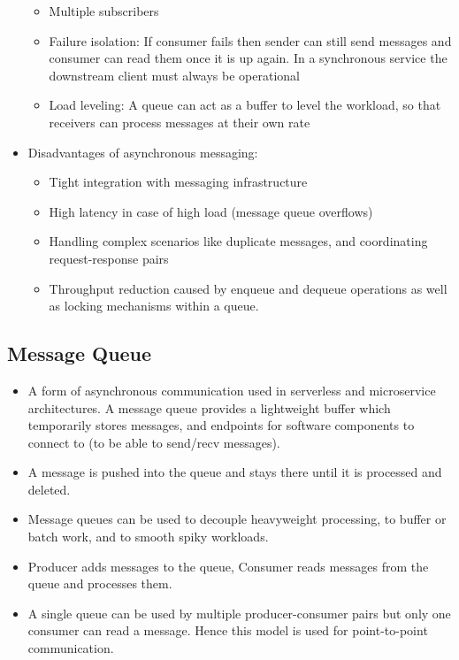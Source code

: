 \documentclass{article}
\begin{document}
\begin{itemize}
\begin{itemize}
        \item Multiple subscribers
        
        \item Failure isolation: If consumer fails then sender can still send messages and consumer can read them once it is up again. In a synchronous service the downstream client must always be operational 
        
        \item Load leveling: A queue can act as a buffer to level the workload, so that receivers can process messages at their own rate
    \end{itemize}
    
    \item Disadvantages of asynchronous messaging:
    \begin{itemize}
        \item Tight integration with messaging infrastructure
        
        \item High latency in case of high load (message queue overflows)
        
        \item Handling complex scenarios like duplicate messages, and coordinating request-response pairs
        
        \item Throughput reduction caused by enqueue and dequeue operations as well as locking mechanisms within a queue. 
    \end{itemize}
\end{itemize}
\subsection{Message Queue}
\begin{itemize}
    \item A form of asynchronous communication used in serverless and microservice architectures. A message queue provides a lightweight buffer which temporarily stores messages, and endpoints for software components to connect to (to be able to send/recv messages).
    
    \item A message is pushed into the queue and stays there until it is processed and deleted.
    
    \item Message queues can be used to decouple heavyweight processing, to buffer or batch work, and to smooth spiky workloads.
    
    \item Producer adds messages to the queue, Consumer reads messages from the queue and processes them. 
    
    \item A single queue can be used by multiple producer-consumer pairs but only one consumer can read a message. Hence this model is used for point-to-point communication. 
\end{itemize}
\end{document}
